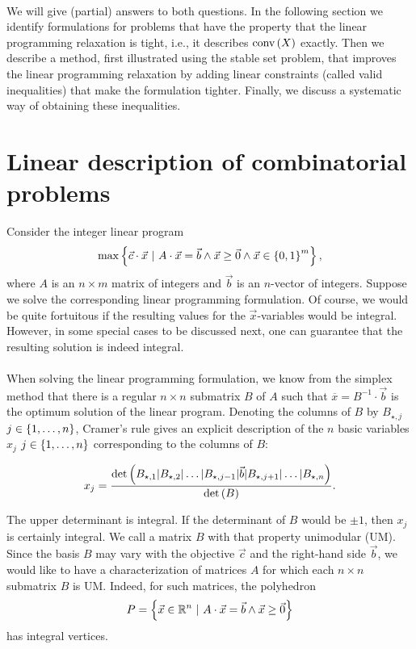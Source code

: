 \paragraph{}
We will give (partial) answers to both questions. In the following section we identify formulations for problems that have the property that the linear programming relaxation is tight, i.e., it describes $\mbox{conv}\left( X \right)$ exactly. Then we describe a method, first illustrated using the stable set problem, that improves the linear programming relaxation by adding linear constraints (called valid inequalities) that make the formulation tighter. Finally, we discuss a systematic way of obtaining these inequalities.

\section{Linear description of combinatorial problems}
Consider the integer linear program
\begin{equation}
\max\left\{ \vec{c}\cdot\vec{x}\ |\ A\cdot\vec{x}=\vec{b}\wedge\vec{x}\geq\vec{0}\wedge\vec{x}\in\left\{ 0,1 \right\}^m \right\},
\end{equation}
where $A$ is an $n\times m$ matrix of integers and $\vec{b}$ is an $n$-vector of integers. Suppose we solve the corresponding linear programming formulation. Of course, we would be quite fortuitous if the resulting values for the $\vec{x}$-variables would be integral. However, in some special cases to be discussed next, one can guarantee that the resulting solution is indeed integral.

\paragraph{}
When solving the linear programming formulation, we know from the simplex method that there is a regular $n\times n$ submatrix $B$ of $A$ such that $\overline{x}=B^{-1}\cdot\vec{b}$ is the optimum solution of the linear program. Denoting the columns of $B$ by $B_{\star,j}$ $j\in\left\{ 1,\ldots,n \right\}$, Cramer's rule gives an explicit description of the $n$ basic variables $x_j$ $j\in\left\{ 1,\ldots,n \right\}$ corresponding to the columns of $B$:

\begin{equation}
x_j=\displaystyle\frac{\mbox{det}\left( B_{\star,1}|B_{\star,2}|\ldots|B_{\star,j-1}|\vec{b}|B_{\star,j+1}|\ldots|B_{\star,n} \right)}{\mbox{det}\left( B \right)}.
\end{equation}

The upper determinant is integral. If the determinant of $B$ would be $\pm 1$, then $x_j$ is certainly integral. We call a matrix $B$ with that property unimodular (UM). Since the basis $B$ may vary with the objective $\vec{c}$ and the right-hand side $\vec{b}$, we would like to have a characterization of matrices $A$ for which each $n\times n$ submatrix $B$ is UM. Indeed, for such matrices, the polyhedron
\begin{equation}
P=\left\{ \vec{x}\in\mathbb{R}^n\ |\ A\cdot\vec{x}=\vec{b}\wedge\vec{x}\geq\vec{0} \right\}
\end{equation}
has integral vertices.

